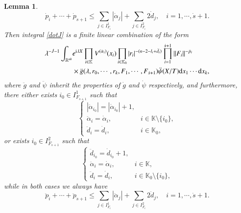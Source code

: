 \documentclass[11pt,reqno]{amsart}
\def\d{{\rm d}}
\newtheorem{lemma}[theorem]{Lemma}
\numberwithin{equation}{section}
\theoremstyle{definition}
\begin{document}
\begin{lemma}
	\begin{equation}\label{sumdotp}
		\dot{p}_i+\cdots+\dot{p}_{\dot{s}+1}\leq\sum_{j\in I_{F_i}^1}|\dot{\alpha}_j|+\sum_{j\in I_{F_i}^2}2\dot{d}_j,\quad i=1,\cdots,\dot{s}+1.
	\end{equation}
	Then integral \eqref{dotJ} is a finite linear combination of the form
	\begin{equation}\label{dotJ+1}
		\begin{split}
			\lambda^{-\dot{J}-1}\int_{\mathbb{R}^{nk}}&e^{\mathrm{i}\lambda X}\prod_{i\in\mathbb{K}}V^{(\ddot{\alpha}_i)}(x_i)\prod_{i\in\mathbb{K}_0}|r_i|^{-(n-2-l_i+\ddot{d}_i)}\prod_{i=1}^{\dot{s}+1}\|F_i\|^{-{\ddot{p}_i}}\\
			&\times \ddot{g}(\lambda,r_0,\cdots,r_k,F_1,\cdots,F_{\dot{s}+1})\ddot{\psi}(X/T)\d x_1\cdots \d x_k,
		\end{split}
	\end{equation}
	where $\ddot{g}$ and $\ddot{\psi}$ inherit the properties of $\dot{g}$ and $\dot{\psi}$ respectively, and furthermore, there either exists $i_0\in I_{F_{\dot{s}+1}}^1$ such that
	\begin{equation}\label{alt1}
		\begin{cases}
			|\ddot{\alpha}_{i_0}|=|\dot{\alpha}_{i_0}|+1,\\
			\ddot{\alpha}_i=\dot{\alpha}_i,\quad&i\in\mathbb{K}\setminus\{i_0\},\\
			\ddot{d}_i=\dot{d}_i,&i\in\mathbb{K}_0,
		\end{cases}
	\end{equation}
	or exists $i_0\in I_{F_{\dot{s}+1}}^2$ such that
	\begin{equation}\label{alt2}
		\begin{cases}
			\ddot{d}_{i_0}=\dot{d}_{i_0}+1,\\
			\ddot{\alpha}_i=\dot{\alpha}_i,\quad&i\in\mathbb{K},\\
			\ddot{d}_i=\dot{d}_i,&i\in\mathbb{K}_0\setminus\{i_0\},
		\end{cases}
	\end{equation}
	while in both cases we always have
	\begin{equation}\label{ddotp}
		\ddot{p}_i+\cdots+\ddot{p}_{\dot{s}+1}\leq\sum_{j\in I_{F_i}^1}|\ddot{\alpha}_j|+\sum_{j\in I_{F_i}^2}2\ddot{d}_j,\quad i=1,\cdots,\dot{s}+1.
	\end{equation}
\end{lemma}
\end{document}
